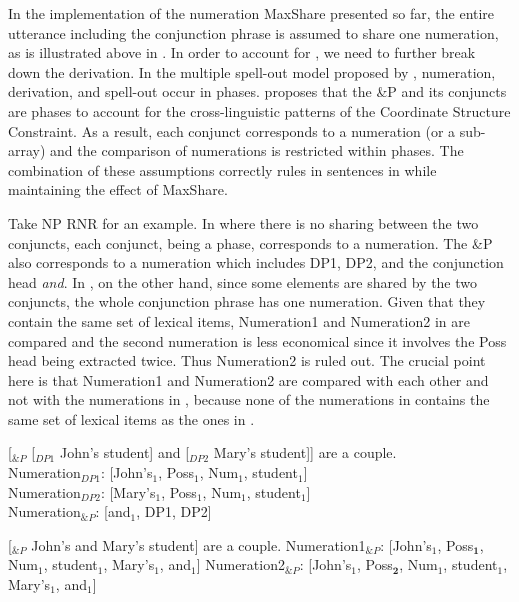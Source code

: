 \documentclass[output=paper]{langscibook}
\begin{document}
In the implementation of the numeration MaxShare presented so far, the entire utterance including the conjunction phrase is assumed to share one numeration, as is illustrated above in . In order to account for , we need to further break down the derivation. In the multiple spell-out model proposed by \citet{Uriagereka:1999a, Chomsky:2000} , numeration, derivation, and spell-out occur in phases. \citet{Oda:2017} proposes that the \&P and its conjuncts are phases to account for the cross-linguistic patterns of the Coordinate Structure Constraint. 
As a result, each conjunct corresponds to a numeration (or a sub-array) and the comparison of numerations is restricted within phases. The combination of these assumptions correctly rules in sentences in  while maintaining the effect of MaxShare. 

Take NP RNR for an example. In  where there is no sharing between the two conjuncts, each conjunct, being a phase, corresponds to a numeration. The \&P also corresponds to a numeration which includes DP1, DP2, and the conjunction head \textit{and}.  In , on the other hand, since some elements are shared by the two conjuncts, the whole conjunction phrase has one numeration. Given that they contain the same set of lexical items, Numeration1 and Numeration2 in  are compared and the second numeration is less economical since it involves the Poss head being extracted twice. Thus Numeration2 is ruled out. The crucial point here is that Numeration1 and Numeration2 are compared with each other and not with the numerations in , because none of the numerations in  contains the same set of lexical items as the ones in . 

\ea 
\label{shenex22}
[$_{\&P}$ [$_{DP1}$ John's student] and [$_{DP2}$ Mary's student]] are a couple.\\
Numeration$_{DP1}$: [John's$_1$, Poss$_1$, Num$_1$, student$_1$]\\
Numeration$_{DP2}$: [Mary's$_1$, Poss$_1$, Num$_1$, student$_1$]\\
Numeration$_{\&P}$: [and$_1$, DP1, DP2]

\ex
\label{shenex23}
[$_{\&P}$ John's and Mary's student] are a couple.
\ea 
	Numeration1$_{\&P}$: [John's$_1$, Poss$_\textbf{1}$, Num$_1$, student$_1$, Mary's$_1$, and$_1$]
\ex 
	Numeration2$_{\&P}$: [John's$_1$, Poss$_\textbf{2}$, Num$_1$, student$_1$, Mary's$_1$, and$_1$]
\z 
\z 
\end{document}
